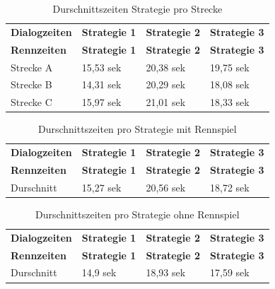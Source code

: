 \documentclass[12pt,a4paper]{scrartcl}
\begin{document}
\begin{longtable}{p{3cm}p{3cm}p{3cm}p{3cm} }
	\label{durchschnittsvorl}\\
	\caption[Durschnittszeiten Strategie pro Strecke]{Durschnittszeiten Strategie pro Strecke}\\
	\hline
	\textbf{Dialogzeiten}&\textbf{Strategie 1}&\textbf{Strategie 2} &\textbf{Strategie 3}\\
	\hline
	\endfirsthead
	\hline
	\textbf{Rennzeiten}&\textbf{Strategie 1}&\textbf{Strategie 2} &\textbf{Strategie 3}\\
	\hline
	\endhead
Strecke A & 15,53 sek & 20,38 sek & 19,75 sek \\
Strecke B & 14,31 sek & 20,29 sek & 18,08 sek \\
Strecke C  & 15,97 sek & 21,01 sek & 18,33 sek \\

\hline
\end{longtable}

\begin{longtable}{p{3cm}p{3cm}p{3cm}p{3cm} }
	\label{Dialogzeiten}\\
	\caption[Durschnittszeiten pro Strategie mit Rennspiel]{Durschnittszeiten pro Strategie mit Rennspiel}\\
	\hline
	\textbf{Dialogzeiten}&\textbf{Strategie 1}&\textbf{Strategie 2} &\textbf{Strategie 3}\\
	\hline
	\endfirsthead
	\hline
	\textbf{Rennzeiten}&\textbf{Strategie 1}&\textbf{Strategie 2} &\textbf{Strategie 3}\\
	\hline
	\endhead
Durschnitt & 15,27 sek & 20,56 sek & 18,72 sek \\


\hline
\end{longtable}

\begin{longtable}{p{3cm}p{3cm}p{3cm}p{3cm} }
	\label{DialogzeitenKCL}\\
	\caption[Durschnittszeiten pro Strategie ohne Rennspiel]{Durschnittszeiten pro Strategie ohne Rennspiel}\\
	\hline
	\textbf{Dialogzeiten}&\textbf{Strategie 1}&\textbf{Strategie 2} &\textbf{Strategie 3}\\
	\hline
	\endfirsthead
	\hline
	\textbf{Rennzeiten}&\textbf{Strategie 1}&\textbf{Strategie 2} &\textbf{Strategie 3}\\
	\hline
	\endhead
Durschnitt &  14,9 sek & 18,93 sek & 17,59 sek \\


\hline
\end{longtable}
\end{document}
